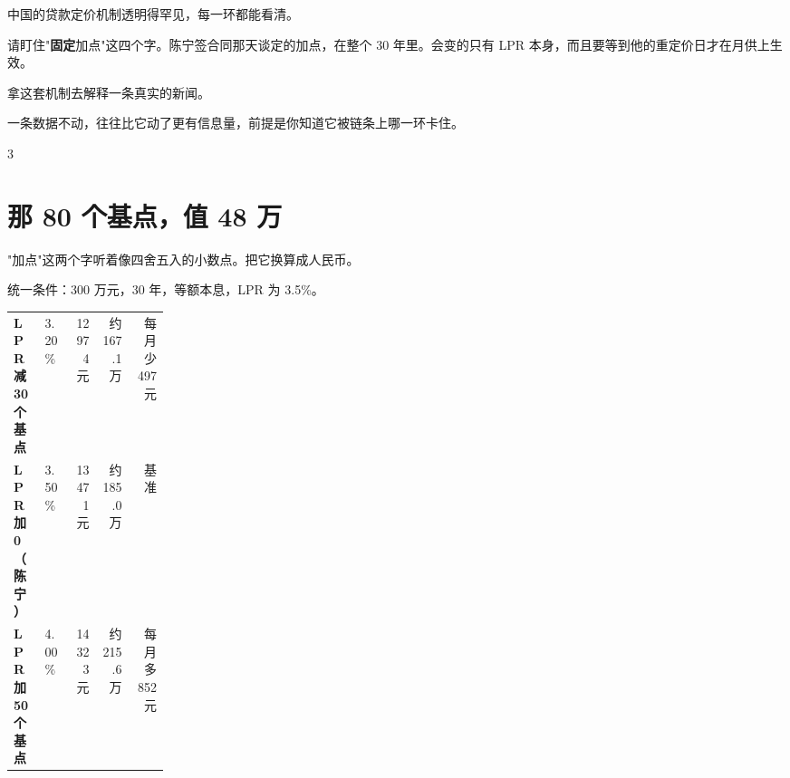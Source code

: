 中国的贷款定价机制透明得罕见，每一环都能看清。

\begin{chainflow}
\chainarrow {}\chainarrow {}\chainarrow {}
\end{chainflow}

请盯住"\textbf{固定}加点"这四个字。陈宁签合同那天谈定的加点，在整个 30 年里。会变的只有 LPR 本身，而且要等到他的重定价日才在月供上生效。

拿这套机制去解释一条真实的新闻。

\begin{talkbox}
\end{talkbox}

一条数据不动，往往比它动了更有信息量，前提是你知道它被链条上哪一环卡住。

\begin{statrow}{3}
\end{statrow}

\section{那 80 个基点，值 48 万}

"加点"这两个字听着像四舍五入的小数点。把它换算成人民币。

统一条件：300 万元，30 年，等额本息，LPR 为 3.5\%。

\begin{tablewrap}
\begin{xltabular}{\linewidth}{>{\raggedright\arraybackslash}p{0.20\linewidth}Xrrr}
\toprule
{} &  &  &  &  \\
\midrule
\textbf{LPR 减 30 个基点} & 3.20\% & 12974 元 & 约 167.1 万 & 每月少 497 元 \\
\textbf{LPR 加 0（陈宁）} & 3.50\% & 13471 元 & 约 185.0 万 & 基准 \\
\textbf{LPR 加 50 个基点} & 4.00\% & 14323 元 & 约 215.6 万 & 每月多 852 元 \\
\bottomrule
\end{xltabular}
\end{tablewrap}


